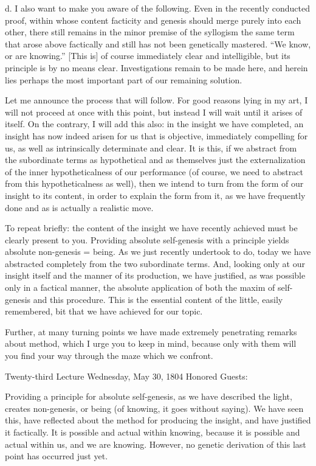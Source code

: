 d. I also want to make you aware of the following.
Even in the recently conducted proof,
within whose content facticity and genesis should merge
purely into each other,
there still remains in the minor premise of the syllogism
the same term that arose above factically
and still has not been genetically mastered.
“We know, or are knowing.”
[This is] of course immediately clear and intelligible,
but its principle is by no means clear.
Investigations remain to be made here,
and herein lies perhaps the most important
part of our remaining solution.

Let me announce the process that will follow.
For good reasons lying in my art,
I will not proceed at once with this point,
but instead I will wait until it arises of itself.
On the contrary, I will add this also:
in the insight we have completed,
an insight has now indeed arisen for us
that is objective, immediately compelling for us,
as well as intrinsically determinate and clear.
It is this, if we abstract from the subordinate terms
as hypothetical and as themselves just the externalization of
the inner hypotheticalness of our performance
(of course, we need to abstract from this hypotheticalness as well),
then we intend to turn from the form of our insight
to its content, in order to explain the form from it,
as we have frequently done and as is actually a realistic move.

To repeat briefly:
the content of the insight we have recently achieved
must be clearly present to you.
Providing absolute self-genesis with a principle
yields absolute non-genesis = being.
As we just recently undertook to do,
today we have abstracted completely
from the two subordinate terms.
And, looking only at our insight itself
and the manner of its production, we have justified,
as was possible only in a factical manner,
the absolute application of both
the maxim of self-genesis and this procedure.
This is the essential content of the little, easily remembered,
bit that we have achieved for our topic.

Further, at many turning points we have made
extremely penetrating remarks about method,
which I urge you to keep in mind,
because only with them will you find
your way through the maze which we confront.

Twenty-third Lecture
Wednesday, May 30, 1804
Honored Guests:

Providing a principle for absolute self-genesis,
as we have described the light, creates non-genesis,
or being (of knowing, it goes without saying).
We have seen this, have reflected about
the method for producing the insight,
and have justified it factically.
It is possible and actual within knowing,
because it is possible and actual within us,
and we are knowing.
However, no genetic derivation of
this last point has occurred just yet.

